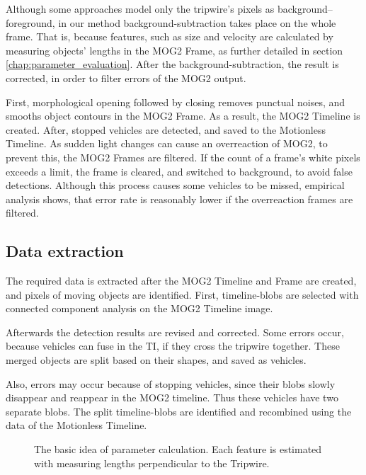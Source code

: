 Although some approaches model only the tripwire's pixels as background--foreground, in our method background-subtraction takes place on the whole frame.
That is, because features, such as size and velocity are calculated by measuring objects' lengths in the MOG2 Frame, as further detailed in section \ref{chap:parameter_evaluation}.
After the background-subtraction, the result is corrected, in order to filter errors of the MOG2 output.

First, morphological opening followed by closing removes punctual noises, and smooths object contours in the MOG2 Frame.
As a result, the MOG2 Timeline is created.
After, stopped vehicles are detected, and saved to the Motionless Timeline.
As sudden light changes can cause an overreaction of MOG2, to prevent this, the MOG2 Frames are filtered.
If the count of a frame's white pixels exceeds a limit, the frame is cleared, and switched to background, to avoid false detections.
Although this process causes some vehicles to be missed, empirical analysis shows, that error rate is reasonably lower if the overreaction frames are filtered.
\subsection{Data extraction}
The required data is extracted after the MOG2 Timeline and Frame are created, and pixels of moving objects are identified.
First, timeline-blobs are selected with connected component analysis on the MOG2 Timeline image.

Afterwards the detection results are revised and corrected.
Some errors occur, because vehicles can fuse in the TI, if they cross the tripwire together. These merged objects are split based on their shapes, and saved as vehicles.

Also, errors may occur because of stopping vehicles, since their blobs slowly disappear and reappear in the MOG2 timeline.
Thus these vehicles have two separate blobs.
The split timeline-blobs are identified and recombined using the data of the Motionless Timeline. 

\begin{figure}[p]
	\centering
	
	\caption[The method for parameter calculation]{The basic idea of parameter calculation. Each feature is estimated with measuring lengths perpendicular to the Tripwire.\label{fig:size_speed_following_distance}}
\end{figure}

